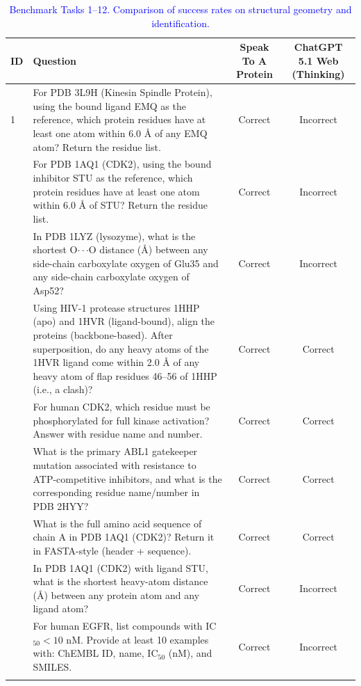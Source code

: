 \documentclass{article}
\newcommand{\new}[1]{\textcolor{blue}{#1}}
\newcommand{\newtable}{\color{blue}}
\newcommand{\new}[1]{#1}
\newcommand{\newtable}{}
\begin{document}
\begin{table}[h]
\newtable
\caption{\new{Benchmark Tasks 1--12. Comparison of success rates on structural geometry and identification.}}
\centering
\small
\begin{tabularx}{\textwidth}{p{0.5cm} X c c}
\toprule
\textbf{ID} & \textbf{Question} & \textbf{Speak To A Protein} & \textbf{ChatGPT 5.1 Web (Thinking)} \\
\midrule
1 & For PDB 3L9H (Kinesin Spindle Protein), using the bound ligand EMQ as the reference, which protein residues have at least one atom within 6.0 \AA{} of any EMQ atom? Return the residue list. & Correct & Incorrect \\ \addlinespace
2 & For PDB 1AQ1 (CDK2), using the bound inhibitor STU as the reference, which protein residues have at least one atom within 6.0 \AA{} of STU? Return the residue list. & Correct & Incorrect \\ \addlinespace
3 & In PDB 1LYZ (lysozyme), what is the shortest O$\cdot\cdot\cdot$O distance (\AA{}) between any side-chain carboxylate oxygen of Glu35 and any side-chain carboxylate oxygen of Asp52? & Correct & Incorrect \\ \addlinespace
4 & Using HIV-1 protease structures 1HHP (apo) and 1HVR (ligand-bound), align the proteins (backbone-based). After superposition, do any heavy atoms of the 1HVR ligand come within 2.0 \AA{} of any heavy atom of flap residues 46–56 of 1HHP (i.e., a clash)? & Correct & Correct \\ \addlinespace
5 & For human CDK2, which residue must be phosphorylated for full kinase activation? Answer with residue name and number. & Correct & Correct \\ \addlinespace
6 & What is the primary ABL1 gatekeeper mutation associated with resistance to ATP-competitive inhibitors, and what is the corresponding residue name/number in PDB 2HYY? & Correct & Correct \\ \addlinespace
7 & What is the full amino acid sequence of chain A in PDB 1AQ1 (CDK2)? Return it in FASTA-style (header + sequence). & Correct & Correct \\ \addlinespace
8 & In PDB 1AQ1 (CDK2) with ligand STU, what is the shortest heavy-atom distance (\AA{}) between any protein atom and any ligand atom? & Correct & Incorrect \\ \addlinespace
9 & For human EGFR, list compounds with IC$_{50} < 10$ nM. Provide at least 10 examples with: ChEMBL ID, name, IC$_{50}$ (nM), and SMILES. & Correct & Incorrect \\ \addlinespace

\end{tabularx}
\end{table}
\end{document}
